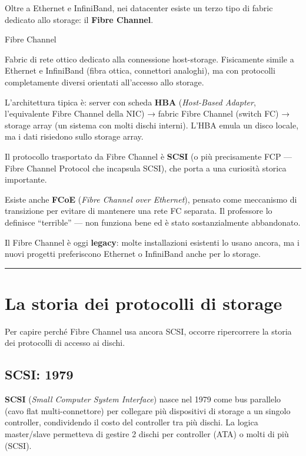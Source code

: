 \documentclass[
  italian,
  openany]{book}
\begin{document}
Oltre a Ethernet e InfiniBand, nei datacenter esiste un terzo tipo di
fabric dedicato allo storage: il \textbf{Fibre Channel}.

\begin{calloutdefinition}{Fibre Channel}

Fabric di rete ottico dedicato alla connessione host-storage.
Fisicamente simile a Ethernet e InfiniBand (fibra ottica, connettori
analoghi), ma con protocolli completamente diversi orientati all'accesso
allo storage.

\end{calloutdefinition}

L'architettura tipica è: server con scheda \textbf{HBA}
(\emph{Host-Based Adapter}, l'equivalente Fibre Channel della NIC) →
fabric Fibre Channel (switch FC) → storage array (un sistema con molti
dischi interni). L'HBA emula un disco locale, ma i dati risiedono sullo
storage array.

Il protocollo trasportato da Fibre Channel è \textbf{SCSI} (o più
precisamente FCP --- Fibre Channel Protocol che incapsula SCSI), che
porta a una curiosità storica importante.

Esiste anche \textbf{FCoE} (\emph{Fibre Channel over Ethernet}), pensato
come meccanismo di transizione per evitare di mantenere una rete FC
separata. Il professore lo definisce ``terrible'' --- non funziona bene
ed è stato sostanzialmente abbandonato.

Il Fibre Channel è oggi \textbf{legacy}: molte installazioni esistenti
lo usano ancora, ma i nuovi progetti preferiscono Ethernet o InfiniBand
anche per lo storage.

\begin{center}\rule{0.5\linewidth}{0.5pt}\end{center}

\section{La storia dei protocolli di
storage}\label{la-storia-dei-protocolli-di-storage}

Per capire perché Fibre Channel usa ancora SCSI, occorre ripercorrere la
storia dei protocolli di accesso ai dischi.

\subsection{SCSI: 1979}\label{scsi-1979}

\textbf{SCSI} (\emph{Small Computer System Interface}) nasce nel 1979
come bus parallelo (cavo flat multi-connettore) per collegare più
dispositivi di storage a un singolo controller, condividendo il costo
del controller tra più dischi. La logica master/slave permetteva di
gestire 2 dischi per controller (ATA) o molti di più (SCSI).
\end{document}
